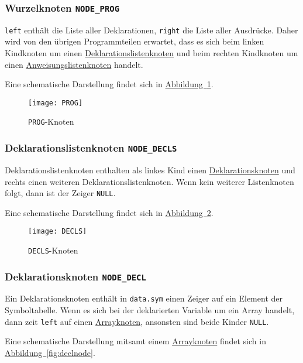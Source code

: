 \subsubsection{Wurzelknoten \texttt{NODE\_PROG}}
\label{sec:prognode}
\texttt{left} enthält die Liste aller Deklarationen,
\texttt{right} die Liste aller Ausdrücke.
Daher wird von den übrigen Programmteilen erwartet,
dass es sich beim linken Kindknoten um einen \hyperref[sec:declsnode]{Deklarationslistenknoten} und beim rechten Kindknoten um einen \hyperref[sec:stmtsnode]{Anweisungslistenknoten} handelt.

Eine schematische Darstellung findet sich in \hyperref[fig:prognode]{Abbildung~\ref{fig:prognode}}.

\begin{figure}[h!]
\label{fig:prognode}
\centering
\texttt{[image: PROG]}
\caption{\texttt{PROG}-Knoten}
\end{figure}

\subsubsection{Deklarationslistenknoten \texttt{NODE\_DECLS}}
\label{sec:declsnode}
Deklarationslistenknoten enthalten als linkes Kind einen \hyperref[sec:declnode]{Deklarationsknoten} und rechts einen weiteren Deklarationslistenknoten.
Wenn kein weiterer Listenknoten folgt,
dann ist der Zeiger \texttt{NULL}.

Eine schematische Darstellung findet sich in \hyperref[fig:declsnode]{Abbildung~\ref{fig:declsnode}}.

\begin{figure}[h!]
\label{fig:declsnode}
\centering
\texttt{[image: DECLS]}
\caption{\texttt{DECLS}-Knoten}
\end{figure}

\subsubsection{Deklarationsknoten \texttt{NODE\_DECL}}
\label{sec:declnode}
Ein Deklarationsknoten enthält in \texttt{data.sym} einen Zeiger auf ein Element der Symboltabelle.
Wenn es sich bei der deklarierten Variable um ein Array handelt,
dann zeit \texttt{left} auf einen \hyperref[sec:arraynode]{Arrayknoten},
ansonsten sind beide Kinder \texttt{NULL}.

Eine schematische Darstellung mitsamt einem \hyperref[sec:arraynode]{Arrayknoten} findet sich in \hyperref[fig:declnode]{Abbildung~\ref{fig:declnode}}.

